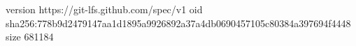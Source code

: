 version https://git-lfs.github.com/spec/v1
oid sha256:778b9d2479147aa1d1895a9926892a37a4db0690457105c80384a397694f4448
size 681184

